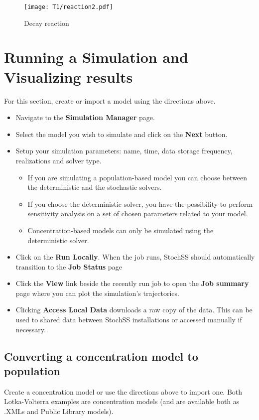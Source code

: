 \begin{figure}[!htb]
\centering
\texttt{[image: T1/reaction2.pdf]}
\caption{Decay reaction}
\label{fig:reaction2}
\end{figure}

\section{Running a Simulation and Visualizing results}

For this section, create or import a model using the directions above.

\begin{itemize}
  \item Navigate to the \textbf{Simulation Manager} page.
  \item Select the model you wish to simulate and click on the \textbf{Next} button.
  \item Setup your simulation parameters: name, time, data storage frequency, realizations and solver type. 
  \begin{itemize}
    \item If you are simulating a population-based model you can choose between the deterministic and the stochastic solvers.
    \item If you choose the deterministic solver, you have the possibility to perform sensitivity analysis on a set of chosen parameters related to your model.
    \item Concentration-based models can only be simulated using the deterministic solver.
  \end{itemize}  
  \item Click on the \textbf{Run Locally}. When the job runs, StochSS should automatically transition to the \textbf{Job Status} page
  \item Click the \textbf{View} link beside the recently run job to open the \textbf{Job summary} page where you can plot the simulation's trajectories.
  \item Clicking \textbf{Access Local Data} downloads a raw copy of the data. This can be used to shared data between StochSS installations or accessed manually if necessary.
\end{itemize}

\subsection{Converting a concentration model to population}
Create a concentration model or use the directions above to import one. Both Lotka-Volterra examples are concentration models (and are available both as .XMLs and Public Library models).

